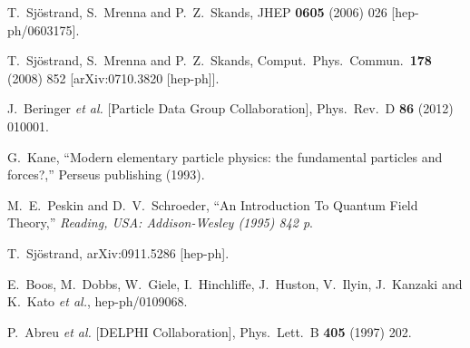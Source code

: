 \documentclass[a4paper,12pt]{article}
\begin{document}
\clearpage
\begin{thebibliography}{99}


  T.~Sjöstrand, S.~Mrenna and P.~Z.~Skands,
  JHEP {\bf 0605} (2006) 026
  [hep-ph/0603175].

  T.~Sjöstrand, S.~Mrenna and P.~Z.~Skands,
  Comput.\ Phys.\ Commun.\  {\bf 178} (2008) 852
  [arXiv:0710.3820 [hep-ph]].
  
  J.~Beringer {\it et al.}  [Particle Data Group Collaboration],
  Phys.\ Rev.\ D {\bf 86} (2012) 010001.

 G.~Kane,
 ``Modern elementary particle physics: the fundamental particles and forces?,''
 Perseus publishing (1993).

  M.~E.~Peskin and D.~V.~Schroeder,
  ``An Introduction To Quantum Field Theory,''
{\it  Reading, USA: Addison-Wesley (1995) 842 p}.

  T.~Sjöstrand,
  arXiv:0911.5286 [hep-ph].

  E.~Boos, M.~Dobbs, W.~Giele, I.~Hinchliffe, J.~Huston, V.~Ilyin, J.~Kanzaki and K.~Kato {\it et al.},
  hep-ph/0109068.


  P.~Abreu {\it et al.}  [DELPHI Collaboration],
  Phys.\ Lett.\ B {\bf 405} (1997) 202.
  

\end{thebibliography}
\end{document}
